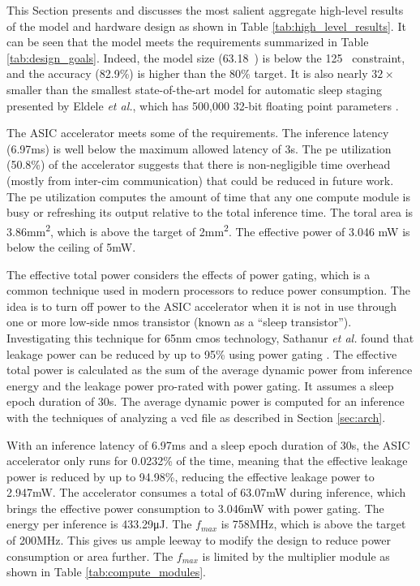 This Section presents and discusses the most salient aggregate high-level results of the model and hardware design as shown in Table \ref{tab:high_level_results}.
It can be seen that the model meets the requirements summarized in Table \ref{tab:design_goals}. Indeed, the model size (63.18\si{\kilo\byte}) is below the
125\si{\kilo\byte} constraint, and the accuracy (82.9\%) is higher than the 80\% target. It is also nearly $32\times$ smaller than the smallest state-of-the-art
model for automatic sleep staging presented by Eldele \textit{et al.}, which has 500,000 32-bit floating point parameters \cite{eldele2021attention}.

The ASIC accelerator meets some of the requirements. The inference latency (6.97\si{\milli\second}) is well below the maximum allowed latency of 3\si{\second}.
The \ac{pe} utilization (50.8\%) of the accelerator suggests that there is non-negligible time overhead (mostly from inter-\ac{cim} communication) that could be
reduced in future work. The \ac{pe} utilization computes the amount of time that any one compute module is busy or refreshing its output relative to the total inference
time. The toral area is 3.86\si{\square\milli\meter}, which is above the target of 2\si{\square\milli\meter}. The effective power of 3.046 \si{\milli\watt} is below
the ceiling of 5\si{\milli\watt}.

The effective total power considers the effects of power gating, which is a common technique used in modern processors to reduce power consumption. The idea
is to turn off power to the ASIC accelerator when it is not in use through one or more low-side \ac{nmos} transistor (known as a ``sleep transistor''). Investigating
this technique for 65nm \ac{cmos} technology, Sathanur \textit{et al.} found that leakage power can be reduced by up to 95\% using power gating \cite{sathanur2008quantifying}.
The effective total power is calculated as the sum of the average dynamic power from inference energy and the leakage power pro-rated with power gating. It assumes a
sleep epoch duration of 30\si{\second}. The average dynamic power is computed for an inference with the techniques of analyzing a \ac{vcd} file as described in 
Section \ref{sec:arch}.

With an inference latency of 6.97\si{\milli\second} and a sleep epoch duration of 30\si{\second}, the ASIC accelerator only runs for 0.0232\% of the time, meaning
that the effective leakage power is reduced by up to 94.98\%, reducing the effective leakage power to 2.947\si{\milli\watt}. The accelerator consumes a total of
63.07\si{\milli\watt} during inference, which brings the effective power consumption to 3.046\si{\milli\watt} with power gating. The energy per inference is
433.29\si{\micro\joule}. The $f_{max}$ is 758\si{\mega\hertz}, which is above the target of 200\si{\mega\hertz}. This gives us ample leeway to modify the design to reduce
power consumption or area further. The $f_{max}$ is limited by the multiplier module as shown in Table \ref{tab:compute_modules}.


